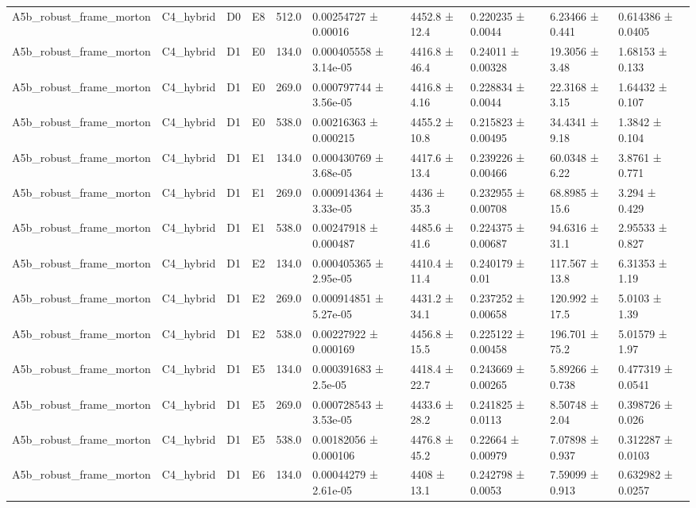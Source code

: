 \begin{table}
\begin{tabular}{llllllllll}
A5b\_robust\_frame\_morton & C4\_hybrid & D0 & E8 & 512.0 & 0.00254727 ± 0.00016 & 4452.8 ± 12.4 & 0.220235 ± 0.0044 & 6.23466 ± 0.441 & 0.614386 ± 0.0405 \\
A5b\_robust\_frame\_morton & C4\_hybrid & D1 & E0 & 134.0 & 0.000405558 ± 3.14e-05 & 4416.8 ± 46.4 & 0.24011 ± 0.00328 & 19.3056 ± 3.48 & 1.68153 ± 0.133 \\
A5b\_robust\_frame\_morton & C4\_hybrid & D1 & E0 & 269.0 & 0.000797744 ± 3.56e-05 & 4416.8 ± 4.16 & 0.228834 ± 0.0044 & 22.3168 ± 3.15 & 1.64432 ± 0.107 \\
A5b\_robust\_frame\_morton & C4\_hybrid & D1 & E0 & 538.0 & 0.00216363 ± 0.000215 & 4455.2 ± 10.8 & 0.215823 ± 0.00495 & 34.4341 ± 9.18 & 1.3842 ± 0.104 \\
A5b\_robust\_frame\_morton & C4\_hybrid & D1 & E1 & 134.0 & 0.000430769 ± 3.68e-05 & 4417.6 ± 13.4 & 0.239226 ± 0.00466 & 60.0348 ± 6.22 & 3.8761 ± 0.771 \\
A5b\_robust\_frame\_morton & C4\_hybrid & D1 & E1 & 269.0 & 0.000914364 ± 3.33e-05 & 4436 ± 35.3 & 0.232955 ± 0.00708 & 68.8985 ± 15.6 & 3.294 ± 0.429 \\
A5b\_robust\_frame\_morton & C4\_hybrid & D1 & E1 & 538.0 & 0.00247918 ± 0.000487 & 4485.6 ± 41.6 & 0.224375 ± 0.00687 & 94.6316 ± 31.1 & 2.95533 ± 0.827 \\
A5b\_robust\_frame\_morton & C4\_hybrid & D1 & E2 & 134.0 & 0.000405365 ± 2.95e-05 & 4410.4 ± 11.4 & 0.240179 ± 0.01 & 117.567 ± 13.8 & 6.31353 ± 1.19 \\
A5b\_robust\_frame\_morton & C4\_hybrid & D1 & E2 & 269.0 & 0.000914851 ± 5.27e-05 & 4431.2 ± 34.1 & 0.237252 ± 0.00658 & 120.992 ± 17.5 & 5.0103 ± 1.39 \\
A5b\_robust\_frame\_morton & C4\_hybrid & D1 & E2 & 538.0 & 0.00227922 ± 0.000169 & 4456.8 ± 15.5 & 0.225122 ± 0.00458 & 196.701 ± 75.2 & 5.01579 ± 1.97 \\
A5b\_robust\_frame\_morton & C4\_hybrid & D1 & E5 & 134.0 & 0.000391683 ± 2.5e-05 & 4418.4 ± 22.7 & 0.243669 ± 0.00265 & 5.89266 ± 0.738 & 0.477319 ± 0.0541 \\
A5b\_robust\_frame\_morton & C4\_hybrid & D1 & E5 & 269.0 & 0.000728543 ± 3.53e-05 & 4433.6 ± 28.2 & 0.241825 ± 0.0113 & 8.50748 ± 2.04 & 0.398726 ± 0.026 \\
A5b\_robust\_frame\_morton & C4\_hybrid & D1 & E5 & 538.0 & 0.00182056 ± 0.000106 & 4476.8 ± 45.2 & 0.22664 ± 0.00979 & 7.07898 ± 0.937 & 0.312287 ± 0.0103 \\
A5b\_robust\_frame\_morton & C4\_hybrid & D1 & E6 & 134.0 & 0.00044279 ± 2.61e-05 & 4408 ± 13.1 & 0.242798 ± 0.0053 & 7.59099 ± 0.913 & 0.632982 ± 0.0257 \\

\end{tabular}
\end{table}
